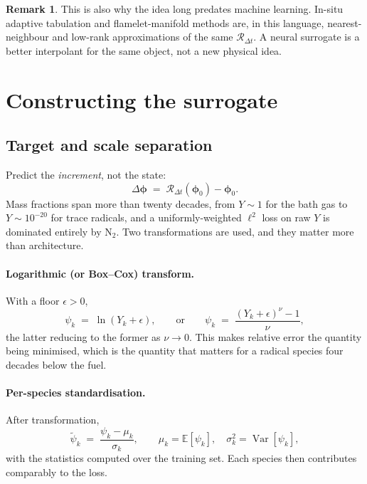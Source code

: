 \documentclass[11pt]{article}
\newcommand{\vv}[1]{\bm{#1}}
\newcommand{\phiv}{\vv{\phi}}
\newcommand{\Rmap}{\mathcal{R}}
\newcommand{\dt}{\Delta t}
\theoremstyle{plain}
\theoremstyle{definition}
\newtheorem{remark}[theorem]{Remark}
\begin{document}
\begin{remark}
This is also why the idea long predates machine learning. In-situ adaptive
tabulation and flamelet-manifold methods are, in this language, nearest-neighbour
and low-rank approximations of the same $\Rmap_{\dt}$. A neural surrogate is a
better interpolant for the same object, not a new physical idea.
\end{remark}

\section{Constructing the surrogate}

\subsection{Target and scale separation}

Predict the \emph{increment}, not the state:
\begin{equation}
\Delta\phiv \;=\; \Rmap_{\dt}(\phiv_0) - \phiv_0 .
\end{equation}
Mass fractions span more than twenty decades, from $Y \sim 1$ for the bath gas
to $Y\sim10^{-20}$ for trace radicals, and a uniformly-weighted $\ell^2$ loss on
raw $Y$ is dominated entirely by $\mathrm{N_2}$. Two transformations are used,
and they matter more than architecture.

\paragraph{Logarithmic (or Box--Cox) transform.} With a floor $\epsilon>0$,
\begin{equation}
\psi_k \;=\; \ln\!\left(Y_k + \epsilon\right),
\qquad\text{or}\qquad
\psi_k \;=\; \frac{(Y_k+\epsilon)^{\nu}-1}{\nu},
\label{eq:boxcox}
\end{equation}
the latter reducing to the former as $\nu\to0$. This makes relative error the
quantity being minimised, which is the quantity that matters for a radical
species four decades below the fuel.

\paragraph{Per-species standardisation.} After transformation,
\begin{equation}
\tilde\psi_k \;=\; \frac{\psi_k - \mu_k}{\sigma_k},
\qquad
\mu_k=\mathbb{E}[\psi_k],\quad \sigma_k^2=\operatorname{Var}[\psi_k],
\end{equation}
with the statistics computed over the training set. Each species then
contributes comparably to the loss.
\end{document}
